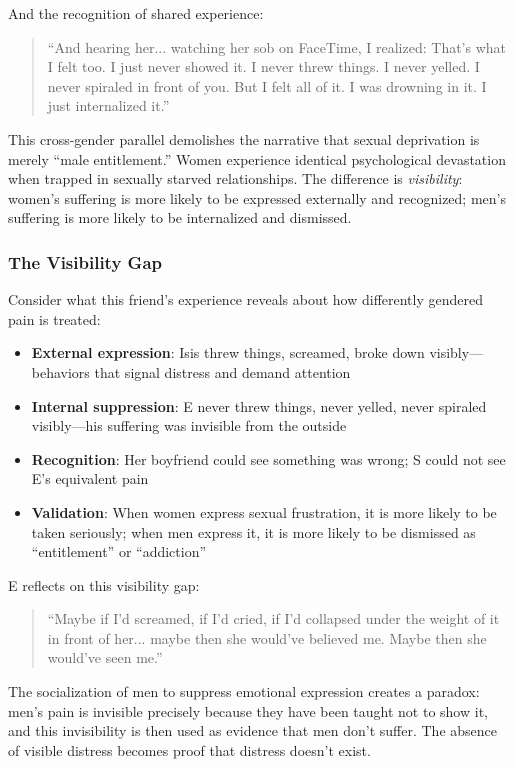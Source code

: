 \documentclass[12pt, letterpaper]{article}
\begin{document}
And the recognition of shared experience:

\begin{quote}
``And hearing her... watching her sob on FaceTime, I realized: That's what I felt too. I just never showed it. I never threw things. I never yelled. I never spiraled in front of you. But I felt all of it. I was drowning in it. I just internalized it.''
\end{quote}

This cross-gender parallel demolishes the narrative that sexual deprivation is merely ``male entitlement.'' Women experience identical psychological devastation when trapped in sexually starved relationships. The difference is \textit{visibility}: women's suffering is more likely to be expressed externally and recognized; men's suffering is more likely to be internalized and dismissed.

\subsubsection{The Visibility Gap}

Consider what this friend's experience reveals about how differently gendered pain is treated:

\begin{itemize}
    \item \textbf{External expression}: Isis threw things, screamed, broke down visibly---behaviors that signal distress and demand attention
    \item \textbf{Internal suppression}: E never threw things, never yelled, never spiraled visibly---his suffering was invisible from the outside
    \item \textbf{Recognition}: Her boyfriend could see something was wrong; S could not see E's equivalent pain
    \item \textbf{Validation}: When women express sexual frustration, it is more likely to be taken seriously; when men express it, it is more likely to be dismissed as ``entitlement'' or ``addiction''
\end{itemize}

E reflects on this visibility gap:

\begin{quote}
``Maybe if I'd screamed, if I'd cried, if I'd collapsed under the weight of it in front of her... maybe then she would've believed me. Maybe then she would've seen me.''
\end{quote}

The socialization of men to suppress emotional expression creates a paradox: men's pain is invisible precisely because they have been taught not to show it, and this invisibility is then used as evidence that men don't suffer. The absence of visible distress becomes proof that distress doesn't exist.
\end{document}
